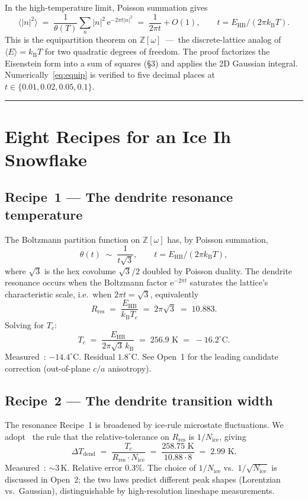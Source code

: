 \documentclass[final]{siamltex}
\newcommand{\EHB}{E_{\text{HB}}}
\newcommand{\Nrule}{N_{\text{ice}}}
\newcommand{\kB}{k_{\mathrm{B}}}
\newcommand{\e}{\mathrm{e}}
\newcommand{\Eisenstein}{\mathbb{Z}[\omega]}
\newcommand{\Rres}{R_{\text{res}}}
\begin{document}
In the high-temperature limit, Poisson summation gives
\begin{equation}\label{eq:equip}
\langle |n|^2 \rangle \;=\;
\frac{1}{\theta(T)} \sum_n |n|^2 \, \e^{-2\pi t |n|^2}
\;=\; \frac{1}{2\pi t} + O(1),
\qquad t = \EHB/(2\pi \kB T).
\end{equation}
This is the equipartition theorem on $\Eisenstein$~---~the
discrete-lattice analog of $\langle E \rangle = \kB T$ for two
quadratic degrees of freedom.  The proof factorizes the
Eisenstein form into a sum of squares (\S3) and applies the
2D Gaussian integral.  Numerically~\eqref{eq:equip} is verified
to five decimal places at $t \in \{0.01, 0.02, 0.05, 0.1\}$.

\bigskip
\hrule
\bigskip

\section{Eight Recipes for an Ice Ih Snowflake}

\subsection{Recipe~1 --- The dendrite resonance temperature}

The Boltzmann partition function on $\Eisenstein$ has, by
Poisson summation,
\[
\theta(t) \;\sim\; \frac{1}{t \sqrt{3}},
\qquad t = \EHB/(2\pi \kB T),
\]
where $\sqrt{3}$ is the hex covolume $\sqrt{3}/2$ doubled by
Poisson duality.  The dendrite resonance occurs when the
Boltzmann factor $\e^{-2\pi t}$ saturates the lattice's
characteristic scale, i.e.\ when $2\pi t = \sqrt{3}$, equivalently
\[
\Rres \;=\; \frac{\EHB}{\kB T_c} \;=\; 2\pi\sqrt{3}\;=\;10.883.
\]
Solving for $T_c$:
\[
T_c \;=\; \frac{\EHB}{2\pi\sqrt{3}\,\kB}
     \;=\; 256.9 \text{ K} \;=\; -16.2^{\circ}\text{C}.
\]
Measured~\cite{Libbrecht2005}: $-14.4^{\circ}$C.  Residual
$1.8^{\circ}$C.  See Open~1 for the leading candidate
correction (out-of-plane $c/a$ anisotropy).

\subsection{Recipe~2 --- The dendrite transition width}

The resonance Recipe~1 is broadened by ice-rule microstate
fluctuations.  We adopt~\cite{MamounPaperV} the rule that the
relative-tolerance on $\Rres$ is $1/\Nrule$, giving
\begin{equation}\label{eq:width}
\Delta T_{\text{dend}} \;=\; \frac{T_c}{\Rres \cdot \Nrule}
                      \;=\; \frac{258.75 \text{ K}}{10.88 \cdot 8}
                      \;=\; 2.99 \text{ K}.
\end{equation}
Measured~\cite{Nakaya1954,Libbrecht2005}: $\sim 3$\,K.  Relative
error $0.3\%$.  The choice of $1/\Nrule$ vs.\ $1/\sqrt{\Nrule}$
is discussed in Open~2; the two laws predict different
peak shapes (Lorentzian vs.\ Gaussian), distinguishable by
high-resolution lineshape measurements.
\end{document}
